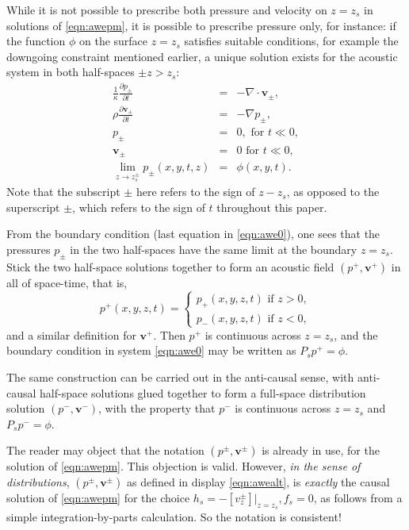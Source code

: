 \documentclass[georeport,12pt]{geophysics}
\newcommand{\bv}{\mathbf{v}}
\begin{document}
While it is not possible to prescribe both pressure and velocity on
$z=z_s$ in solutions of \ref{eqn:awepm}, it is possible to
prescribe pressure only, for instance: if the function $\phi$ on
the surface $z=z_s$ satisfies suitable conditions, for
example the downgoing constraint mentioned earlier, a unique solution
exists for the acoustic system in both half-spaces $\pm z > z_s$:
\begin{eqnarray}
\label{eqn:awe0}
  \frac{1}{\kappa}\frac{\partial p_{\pm}}{\partial t} & = & - \nabla \cdot \bv_{\pm}, \nonumber \\
  \rho\frac{\partial \bv_{\pm}}{\partial t} & = & - \nabla
                                                    p_{\pm}, \nonumber \\
  p_{\pm} & =& 0,  \mbox{ for } t \ll 0, \nonumber\\ 
  \bv_{\pm} & = & 0 \mbox{ for } t \ll 0, \nonumber\\
  \lim_{z \rightarrow z_s^{\pm}}p_{\pm}(x,y,t,z)& =& \phi(x,y,t).
\end{eqnarray}
Note that the subscript $\pm$ here refers to the sign of $z-z_s$, as opposed
to the superscript ${\pm}$, which refers to the sign of $t$ throughout
this paper.

From the boundary condition (last equation in \ref{eqn:awe0}), one
sees that the pressures $p_{\pm}$ in the two half-spaces have the same
limit at the boundary $z=z_s$. Stick the two half-space
solutions together to form an acoustic field $(p^+,\bv^+)$ in all of
space-time, that is,
\begin{equation}
  \label{eqn:awealt}
  p^+(x,y,z,t) =
  \left\{
    \begin{array}{c}
      p_+(x,y,z,t) \mbox{ if } z>0,\\
      p_-(x,y,z,t) \mbox{ if } z<0,
    \end{array}
  \right.
\end{equation}
and a similar definition for $\bv^+$. Then $p^+$ is continuous across
$z=z_s$, and the boundary condition in system \ref{eqn:awe0} may be
written as $P_sp^+=\phi$.

The same construction can be carried out in the anti-causal sense,
with anti-causal half-space solutions glued together to form a
full-space distribution solution $(p^-,\bv^-)$, with the property that
$p^-$ is continuous across $z=z_s$ and $P_sp^-=\phi$.

The reader may object that the notation $(p^\pm,\bv^\pm)$ is already in
use, for the solution of \ref{eqn:awepm}. This objection is
valid. However, {\em in the sense
  of distributions}, $(p^{\pm},\bv^{\pm})$ as defined in display
\ref{eqn:awealt}, is {\em exactly} the causal solution of \ref{eqn:awepm}
for the choice $h_s = -[v^{\pm}_{z}]|_{z=z_s}, f_s=0$, as follows from a
simple integration-by-parts calculation. So the notation is consistent!
\end{document}
